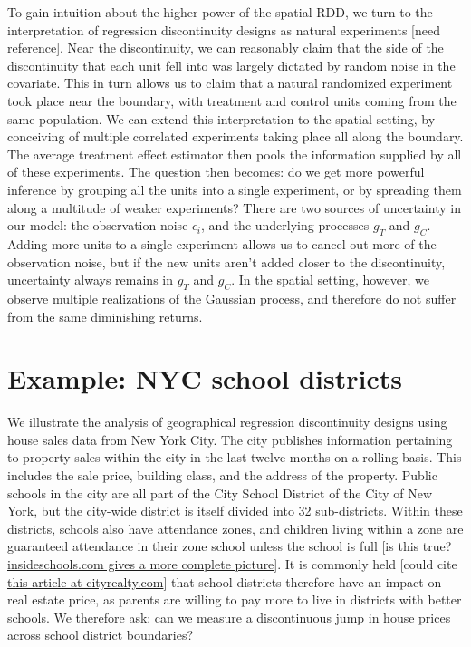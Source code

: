 \documentclass[letter]{article}
\begin{document}
To gain intuition about the higher power of the spatial RDD, we turn to the interpretation of regression discontinuity designs as natural experiments {[}need reference{]}.
Near the discontinuity, we can reasonably claim that the side of the discontinuity that each unit fell into was largely dictated by random noise in the covariate.
This in turn allows us to claim that a natural randomized experiment took place near the boundary, with treatment and control units coming from the same population.
We can extend this interpretation to the spatial setting, by conceiving of multiple correlated experiments taking place all along the boundary.
The average treatment effect estimator then pools the information supplied by all of these experiments.
The question then becomes: do we get more powerful inference by grouping all the units into a single experiment, or by spreading them along a multitude of weaker experiments?
There are two sources of uncertainty in our model: the observation noise \(\epsilon_i\), and the underlying processes \(g_T\) and \(g_C\). Adding more units to a single experiment allows us to cancel out more of the observation noise, but if the new units aren't added closer to the discontinuity, uncertainty always remains in \(g_T\) and \(g_C\). In the spatial setting, however, we observe multiple realizations of the Gaussian process, and therefore do not suffer from the same diminishing returns.
    


    	\section{Example: NYC school districts}\label{example-nyc-school-districts}

We illustrate the analysis of geographical regression discontinuity designs using house sales data from New York City.
The city publishes information pertaining to property sales within the city in the last twelve months on a rolling basis.
This includes the sale price, building class, and the address of the property.
Public schools in the city are all part of the City School District of the City of New York, but the city-wide district is itself divided into 32 sub-districts.
Within these districts, schools also have attendance zones, and children living within a zone are guaranteed attendance in their zone school unless the school is full {[}is this true? \href{http://insideschools.org/elementary/how-to-apply}{insideschools.com gives a more complete picture}{]}.
It is commonly held {[}could cite \href{https://www.cityrealty.com/nyc/market-insight/features/trending-in-ny/buying-renting-school-zone-district-what-you-need-know/3661}{this article at cityrealty.com}{]} that school districts therefore have an impact on real estate price, as parents are willing to pay more to live in districts with better schools.
We therefore ask: can we measure a discontinuous jump in house prices across school district boundaries?
    
\end{document}
